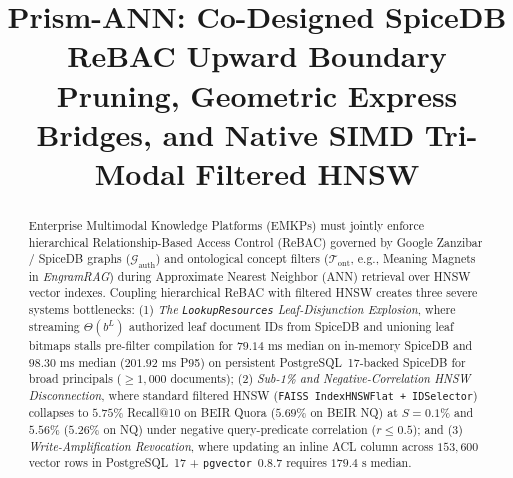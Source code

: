 \documentclass[conference]{IEEEtran}
\title{\textbf{Prism-ANN: Co-Designed SpiceDB ReBAC Upward Boundary Pruning, Geometric Express Bridges, and Native SIMD Tri-Modal Filtered HNSW}}
\author{
  \IEEEauthorblockN{Bhavyateja Potineni}
  \IEEEauthorblockA{\textit{Independent Researcher}}
}
\begin{document}
\maketitle

\begin{abstract}
Enterprise Multimodal Knowledge Platforms (EMKPs) must jointly enforce hierarchical Relationship-Based Access Control (ReBAC) governed by Google Zanzibar / SpiceDB graphs ($\mathcal{G}_{\text{auth}}$) and ontological concept filters ($\mathcal{T}_{\text{ont}}$, e.g., Meaning Magnets in \textit{EngramRAG}) during Approximate Nearest Neighbor (ANN) retrieval over HNSW vector indexes. Coupling hierarchical ReBAC with filtered HNSW creates three severe systems bottlenecks: (1) \textit{The \texttt{LookupResources} Leaf-Disjunction Explosion}, where streaming $\Theta(b^L)$ authorized leaf document IDs from SpiceDB and unioning leaf bitmaps stalls pre-filter compilation for $79.14\text{ ms}$ median on in-memory SpiceDB and $98.30\text{ ms}$ median ($201.92\text{ ms}$ P95) on persistent PostgreSQL~17-backed SpiceDB for broad principals ($\ge 1{,}000$ documents); (2) \textit{Sub-1\% and Negative-Correlation HNSW Disconnection}, where standard filtered HNSW (\texttt{FAISS IndexHNSWFlat + IDSelector}) collapses to $5.75\%$ Recall@10 on BEIR Quora ($5.69\%$ on BEIR NQ) at $S=0.1\%$ and $5.56\%$ ($5.26\%$ on NQ) under negative query-predicate correlation ($r \le 0.5$); and (3) \textit{Write-Amplification Revocation}, where updating an inline ACL column across $153{,}600$ vector rows in PostgreSQL~17 + \texttt{pgvector}~0.8.7 requires $179.4\text{ s}$ median.


\end{abstract}
\end{document}
